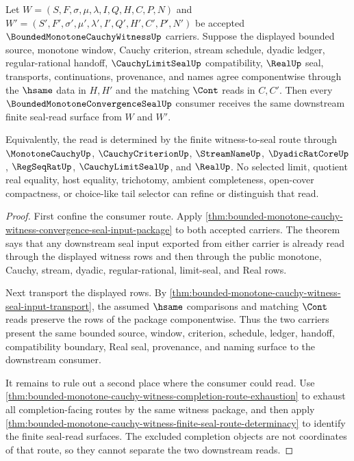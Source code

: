 \begin{theorem}
\label{thm:bounded-monotone-cauchy-witness-convergence-seal-read-determinacy}
Let $W=(S,F,\sigma,\mu,\lambda,I,Q,H,C,P,N)$ and $W'=(S',F',\sigma',\mu',\lambda',I',Q',H',C',P',N')$ be accepted $\BoundedMonotoneCauchyWitnessUp$ carriers. Suppose the displayed bounded source, monotone window, Cauchy criterion, stream schedule, dyadic ledger, regular-rational handoff, $\CauchyLimitSealUp$ compatibility, $\RealUp$ seal, transports, continuations, provenance, and names agree componentwise through the $\hsame$ data in $H,H'$ and the matching $\Cont$ reads in $C,C'$. Then every $\BoundedMonotoneConvergenceSealUp$ consumer receives the same downstream finite seal-read surface from $W$ and $W'$.

Equivalently, the read is determined by the finite witness-to-seal route through $\MonotoneCauchyUp$, $\CauchyCriterionUp$, $\StreamNameUp$, $\DyadicRatCoreUp$, $\RegSeqRatUp$, $\CauchyLimitSealUp$, and $\RealUp$. No selected limit, quotient real equality, host equality, trichotomy, ambient completeness, open-cover compactness, or choice-like tail selector can refine or distinguish that read.
\end{theorem}
\begin{proof}
First confine the consumer route. Apply \autoref{thm:bounded-monotone-cauchy-witness-convergence-seal-input-package} to both accepted carriers. The theorem says that any downstream seal input exported from either carrier is already read through the displayed witness rows and then through the public monotone, Cauchy, stream, dyadic, regular-rational, limit-seal, and Real rows.

Next transport the displayed rows. By \autoref{thm:bounded-monotone-cauchy-witness-seal-input-transport}, the assumed $\hsame$ comparisons and matching $\Cont$ reads preserve the rows of the package componentwise. Thus the two carriers present the same bounded source, window, criterion, schedule, ledger, handoff, compatibility boundary, Real seal, provenance, and naming surface to the downstream consumer.

It remains to rule out a second place where the consumer could read. Use \autoref{thm:bounded-monotone-cauchy-witness-completion-route-exhaustion} to exhaust all completion-facing routes by the same witness package, and then apply \autoref{thm:bounded-monotone-cauchy-witness-finite-seal-route-determinacy} to identify the finite seal-read surfaces. The excluded completion objects are not coordinates of that route, so they cannot separate the two downstream reads.
\end{proof}

